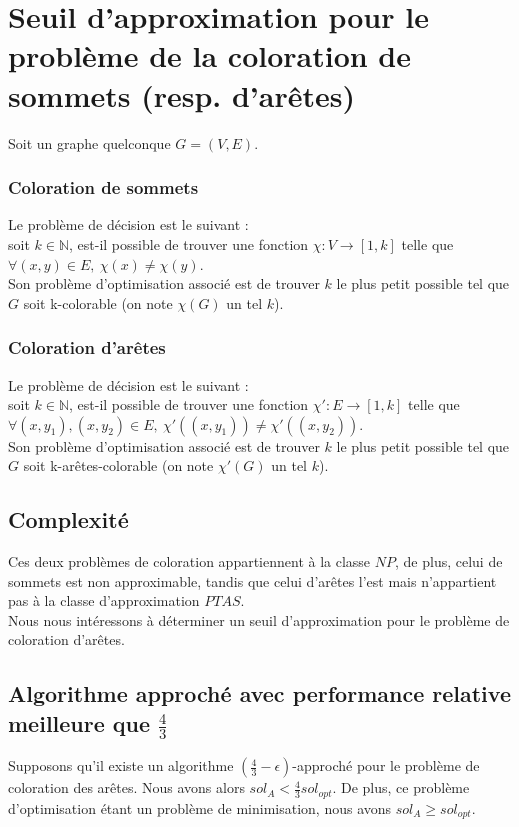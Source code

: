 \section{Seuil d'approximation pour le problème de la coloration de sommets (resp.
d'arêtes)}\label{ex11}

Soit un graphe quelconque $G = (V,E)$.

\subsubsection{Coloration de sommets}\label{ex11_def_sommets}
Le problème de décision est le suivant :\\
soit $k \in \mathbb{N}$, est-il possible de trouver une fonction $\chi : V \rightarrow
[1,k]$ telle que $\forall (x,y) \in E,\ \chi(x) \neq \chi(y)$.\\
Son problème d'optimisation associé est de trouver $k$ le plus petit possible tel que $G$
soit k-colorable (on note $\chi(G)$ un tel $k$).

\subsubsection{Coloration d'arêtes}\label{ex11_def_aretes}
Le problème de décision est le suivant :\\
soit $k \in \mathbb{N}$, est-il possible de trouver une fonction $\chi' : E \rightarrow
[1,k]$ telle que $\forall (x,y_1),(x,y_2) \in E,\ \chi'((x,y_1)) \neq \chi'((x,y_2))$.\\
Son problème d'optimisation associé est de trouver $k$ le plus petit possible tel que $G$
soit k-arêtes-colorable (on note $\chi'(G)$ un tel $k$).

\subsection{Complexité}\label{ex11_q1}
Ces deux problèmes de coloration appartiennent à la classe $NP$, de plus, celui de
sommets est non approximable, tandis que celui d'arêtes l'est mais n'appartient pas à la 
classe d'approximation $PTAS$.\\
Nous nous intéressons à déterminer un seuil d'approximation pour le problème
de coloration d'arêtes.

\subsection{Algorithme approché avec performance relative meilleure que $\frac{4}{3}$}\label{ex11_q2}
Supposons qu'il existe un algorithme $(\frac{4}{3} - \epsilon)$-approché pour le
problème de coloration des arêtes.
Nous avons alors $sol_A < \frac{4}{3} sol_{opt}$.
De plus, ce problème d'optimisation étant un problème de minimisation, nous avons $sol_A
\geq sol_{opt}$.

